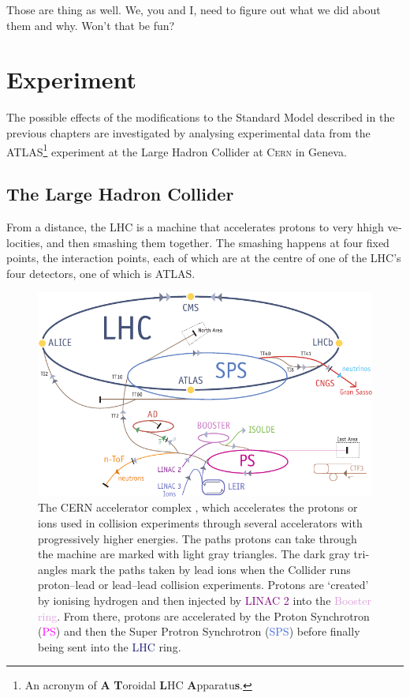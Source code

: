 \begin{english}
Those are thing as well. We, you and I, need to figure out what we did about them and why. Won't that be fun?

\chapter{Experiment}\label{ch.exp}

The possible effects of the modifications to the Standard Model described in the previous chapters are investigated by analysing experimental data from the ATLAS\footnote{An acronym of \textbf{A} \textbf{T}oroidal \textbf{L}HC \textbf{A}pparatu\textbf{s}.} experiment at the Large Hadron Collider at \textsc{Cern} in Geneva.

\section{The Large Hadron Collider}
From a distance, the LHC is a machine that accelerates protons to very hhigh velocities, and then smashing them together. The smashing happens at four fixed points, the interaction points, each of which are at the centre of one of the LHC's four detectors, one of which is ATLAS.

\begin{figure}[hbtp]
\begin{center}
\includegraphics[width=.8\textwidth]{Cernrings}
\end{center}
\begin{minipage}[b]{\textwidth}
\caption{The CERN accelerator complex \cite{cernbro}, which accelerates the protons or ions used in collision experiments through several accelerators with progressively higher energies. The paths protons can take through the machine are marked with light gray triangles. The dark gray triangles mark the paths taken by lead ions when the Collider runs proton--lead or lead--lead collision experiments. Protons are `created' by ionising hydrogen and then injected by \textcolor{Purple}{LINAC 2} into the \textcolor{Plum}{Booster ring}. From there, protons are accelerated by the Proton Synchrotron (\textcolor{Magenta}{PS}) and then the Super Protron Synchrotron (\textcolor{RoyalBlue}{SPS}) before finally being sent into the \textcolor{MidnightBlue}{LHC} ring.}
\label{cernrings}
\end{minipage}
\end{figure}


\end{english}
